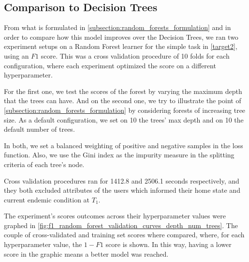 \subsection{ Comparison to Decision Trees}\label{subsection:random_forests_comparison_trees}

From what is formulated in \cref{subsection:random_forests_formulation} and in order to compare how this model improves over the Decision Trees,  we ran two experiment setups on a Random Forest learner for the simple task in \cref{target2}, using an $F1$ score. This was a cross validation procedure of 10 folds for each configuration, where each experiment optimized the score on a different hyperparameter.

For the first one, we test the scores of the forest by varying the maximum depth that the trees can have.
And on the second one, we try to illustrate the point of \cref{subsection:random_forests_formulation} by considering forests of increasing tree size.
As a default configuration, we set on 10 the trees' max depth and on 10 the default number of trees.

In both, we set a balanced weighting of positive and negative samples in the loss function. Also, we use the Gini index as the impurity measure in the splitting criteria of each tree's node.

Cross validation procedures ran for 1412.8 and 2506.1 seconds respectively, and they both excluded attributes of the users which informed their home state and current endemic condition at $T_1$.

The experiment's scores outcomes across their hyperparameter values were graphed in \cref{fig:f1_random_forest_validation_curves_depth_num_trees}.
The couple of cross-validated and training set scores where compared, where, for each hyperparameter value, the $1-F1$ score is shown.
In this way, having a lower score in the graphic means a better model was reached.


